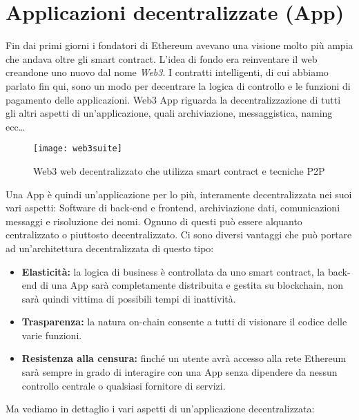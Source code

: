 \section{Applicazioni decentralizzate (\DH App)}
Fin dai primi giorni i fondatori di Ethereum avevano una visione molto più ampia che andava oltre gli smart contract. L'idea di fondo era reinventare il web creandone uno nuovo dal nome \textit{Web3}. I contratti intelligenti, di cui abbiamo parlato fin qui, sono un modo per decentrare la logica di controllo e le funzioni di pagamento delle applicazioni. Web3 \DH App riguarda la decentralizzazione di tutti gli altri aspetti di un'applicazione, quali archiviazione, messaggistica, naming ecc\dots
%
\begin{figure}
	\centering 
	\texttt{[image: web3suite]} 
	\caption[Web3 web decentralizzato che utilizza smart contract e tecniche P2P]{Web3 web decentralizzato che utilizza smart contract e tecniche P2P}
	\label{fig:web3siute} 
\end{figure}
%
Una \DH App è quindi un'applicazione per lo più, interamente decentralizzata nei suoi vari aspetti: Software di back-end e frontend, archiviazione dati, comunicazioni messaggi e risoluzione dei nomi. Ognuno di questi può essere alquanto centralizzato o piuttosto decentralizzato. Ci sono diversi vantaggi che può portare ad un'architettura decentralizzata di questo tipo:
\begin{itemize}
	\item \textbf{Elasticità:} la logica di business è controllata da uno smart contract, la back-end di una \DH App sarà completamente distribuita e gestita su blockchain, non sarà quindi vittima di possibili tempi di inattività.
	\item \textbf{Trasparenza:} la natura on-chain consente a tutti di visionare il codice delle varie funzioni.
	\item \textbf{Resistenza alla censura:} finché un utente avrà accesso alla rete Ethereum sarà sempre in grado di interagire con una \DH App senza dipendere da nessun controllo centrale o qualsiasi fornitore di servizi.
\end{itemize}
Ma vediamo in dettaglio i vari aspetti di un'applicazione decentralizzata:

